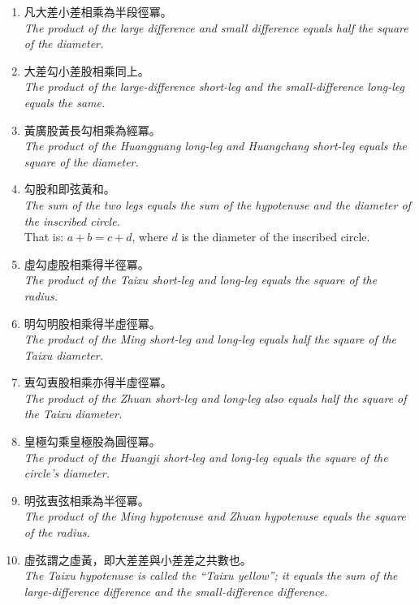 \documentclass[11pt,a4paper]{article}
\begin{document}
\begin{enumerate}[leftmargin=2em]
  \item 凡大差小差相乘為半段徑冪。\\
  \textit{The product of the large difference and small difference equals half the square of the diameter.}
  
  \item 大差勾小差股相乘同上。\\
  \textit{The product of the large-difference short-leg and the small-difference long-leg equals the same.}
  
  \item 黃廣股黃長勾相乘為經冪。\\
  \textit{The product of the Huangguang long-leg and Huangchang short-leg equals the square of the diameter.}
  
  \item 勾股和即弦黃和。\\
  \textit{The sum of the two legs equals the sum of the hypotenuse and the diameter of the inscribed circle.}\\
  That is: $a + b = c + d$, where $d$ is the diameter of the inscribed circle.
  
  \item 虛勾虛股相乘得半徑冪。\\
  \textit{The product of the Taixu short-leg and long-leg equals the square of the radius.}
  
  \item 明勾明股相乘得半虛徑冪。\\
  \textit{The product of the Ming short-leg and long-leg equals half the square of the Taixu diameter.}
  
  \item 叀勾叀股相乘亦得半虛徑冪。\\
  \textit{The product of the Zhuan short-leg and long-leg also equals half the square of the Taixu diameter.}
  
  \item 皇極勾乘皇極股為圓徑冪。\\
  \textit{The product of the Huangji short-leg and long-leg equals the square of the circle's diameter.}
  
  \item 明弦叀弦相乘為半徑冪。\\
  \textit{The product of the Ming hypotenuse and Zhuan hypotenuse equals the square of the radius.}
  
  \item 虛弦謂之虛黃，即大差差與小差差之共數也。\\
  \textit{The Taixu hypotenuse is called the ``Taixu yellow''; it equals the sum of the large-difference difference and the small-difference difference.}
\end{enumerate}
\end{document}
